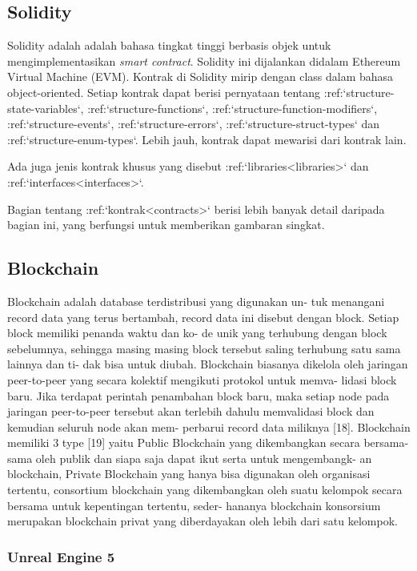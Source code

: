 \subsection{Solidity}
Solidity adalah adalah bahasa tingkat tinggi berbasis objek untuk mengimplementasikan
\emph{smart contract}. Solidity ini dijalankan didalam Ethereum Virtual Machine (EVM).
Kontrak di Solidity mirip dengan class dalam bahasa object-oriented. Setiap kontrak dapat berisi pernyataan tentang :ref:`structure-state-variables`, :ref:`structure-functions`, :ref:`structure-function-modifiers`, :ref:`structure-events`, :ref:`structure-errors`, :ref:`structure-struct-types` dan :ref:`structure-enum-types`. Lebih jauh, kontrak dapat mewarisi dari kontrak lain.

Ada juga jenis kontrak khusus yang disebut :ref:`libraries<libraries>` dan :ref:`interfaces<interfaces>`.

Bagian tentang :ref:`kontrak<contracts>` berisi lebih banyak detail daripada bagian ini, yang berfungsi untuk memberikan gambaran singkat.

\subsection{Blockchain}

Blockchain adalah database terdistribusi yang digunakan un-
tuk menangani record data yang terus bertambah, record data ini
disebut dengan block. Setiap block memiliki penanda waktu dan ko-
de unik yang terhubung dengan block sebelumnya, sehingga masing
masing block tersebut saling terhubung satu sama lainnya dan ti-
dak bisa untuk diubah. Blockchain biasanya dikelola oleh jaringan
peer-to-peer yang secara kolektif mengikuti protokol untuk memva-
lidasi block baru. Jika terdapat perintah penambahan block baru,
maka setiap node pada jaringan peer-to-peer tersebut akan terlebih
dahulu memvalidasi block dan kemudian seluruh node akan mem-
perbarui record data miliknya [18]. Blockchain memiliki 3 type [19]
yaitu Public Blockchain yang dikembangkan secara bersama-sama
oleh publik dan siapa saja dapat ikut serta untuk mengembangk-
an blockchain, Private Blockchain yang hanya bisa digunakan oleh
organisasi tertentu, consortium blockchain yang dikembangkan oleh
suatu kelompok secara bersama untuk kepentingan tertentu, seder-
hananya blockchain konsorsium merupakan blockchain privat yang
diberdayakan oleh lebih dari satu kelompok.

\subsubsection{Unreal Engine 5}

